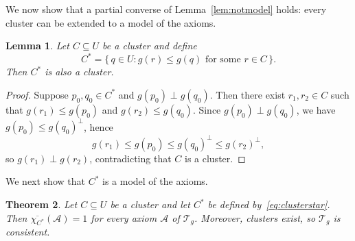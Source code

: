 \documentclass{article}   	%
\theoremstyle{plain}
\newtheorem{theorem}{Theorem}[section]
\newtheorem{lemma}[theorem]{Lemma}
\theoremstyle{definition}
\theoremstyle{remark}
\begin{document}
We now show that a partial converse of Lemma~\ref{lem:notmodel} holds:
every cluster can be extended to a model of the axioms.

\begin{lemma}
\label{lem:clusterstar}
Let $C \subseteq U$ be a cluster and define
\begin{equation}
\label{eq:clusterstar}
C^* = \{\, q \in U : g(r)\le g(q) \text{ for some } r \in C \,\}.
\end{equation}
Then $C^*$ is also a cluster.
\end{lemma}

\begin{proof}
Suppose $p_0,q_0 \in C^*$ and $g(p_0)\perp g(q_0)$.
Then there exist $r_1,r_2 \in C$ such that
$g(r_1)\le g(p_0)$ and $g(r_2)\le g(q_0)$.
Since $g(p_0)\perp g(q_0)$, we have $g(p_0)\le g(q_0)^\perp$, hence
\[
g(r_1)\le g(p_0)\le g(q_0)^\perp \le g(r_2)^\perp,
\]
so $g(r_1)\perp g(r_2)$, contradicting that $C$ is a cluster.
\end{proof}

We next show that $C^*$ is a model of the axioms.

\begin{theorem}
\label{thmC}
Let $C\subseteq U$ be a cluster and let $C^*$ be defined
by~\eqref{eq:clusterstar}.
Then $\overline{\chi_{C^*}}(\mathcal A)=1$ for every axiom $\mathcal A$ of
$\mathcal T_g$.
Moreover, clusters exist, so $\mathcal T_g$ is consistent.
\end{theorem}
\end{document}
